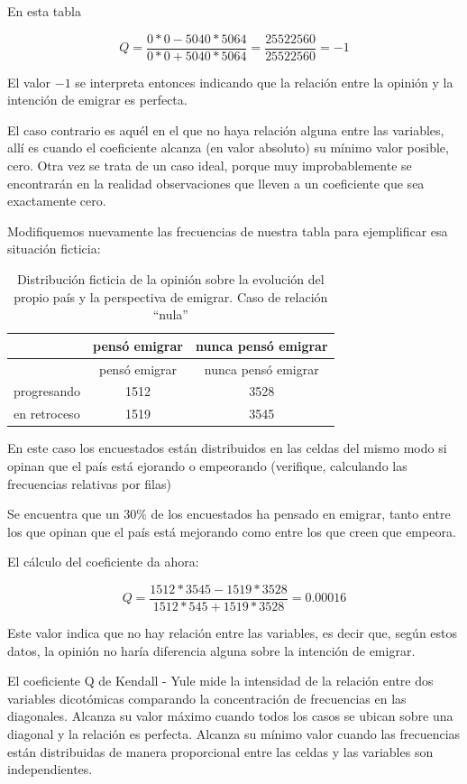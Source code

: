 \documentclass[]{book}
\begin{document}
En esta tabla

\[Q = \frac{0*0 - 5040*5064}{0*0+5040*5064} = \frac{25522560}{25522560} = -1\]

El valor \(-1\) se interpreta entonces indicando que la relación entre la opinión y la intención de emigrar es perfecta.

El caso contrario es aquél en el que no haya relación alguna entre las
variables, allí es cuando el coeficiente alcanza (en valor absoluto) su mínimo valor posible, cero. Otra vez se trata de un caso ideal, porque muy improbablemente se encontrarán en la realidad observaciones que lleven a un coeficiente que sea exactamente cero.

Modifiquemos nuevamente las frecuencias de nuestra tabla para
ejemplificar esa situación ficticia:

\begin{longtable}[]{@{}lcc@{}}
\caption{\label{tab:unnamed-chunk-139}Distribución ficticia de la opinión sobre la evolución del propio país y la perspectiva de emigrar. Caso de relación ``nula''}\tabularnewline
\toprule
& pensó emigrar & nunca pensó emigrar\tabularnewline
\midrule
\endfirsthead
\toprule
& pensó emigrar & nunca pensó emigrar\tabularnewline
\midrule
\endhead
progresando & 1512 & 3528\tabularnewline
en retroceso & 1519 & 3545\tabularnewline
\bottomrule
\end{longtable}

En este caso los encuestados están distribuidos en las celdas del mismo modo si opinan que el país está ejorando o empeorando (verifique, calculando las frecuencias relativas por filas)

Se encuentra que un 30\% de los encuestados ha pensado en emigrar, tanto entre los que opinan que el país está mejorando como entre los que creen que empeora.

El cálculo del coeficiente da ahora:

\[Q = \frac{1512*3545-1519*3528}{1512*545+1519*3528} = 0.00016\]

Este valor indica que no hay relación entre las variables, es decir que, según estos datos, la opinión no haría diferencia alguna sobre la intención de emigrar.

El coeficiente Q de Kendall - Yule mide la intensidad de la relación
entre dos variables dicotómicas comparando la concentración de
frecuencias en las diagonales. Alcanza su valor máximo cuando todos los casos se ubican sobre una diagonal y la relación es perfecta. Alcanza su mínimo valor cuando las frecuencias están distribuidas de manera proporcional entre las celdas y las variables son independientes.
\end{document}

